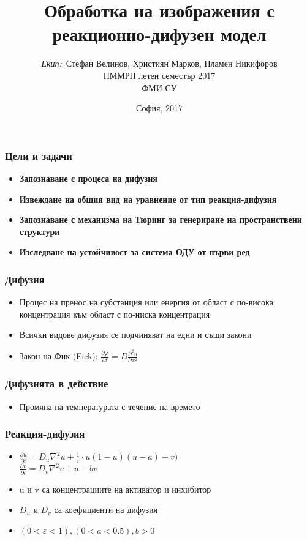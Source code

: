 \documentclass[14pt]{beamer}
\title{\small{Обработка на изображения с реакционно-дифузен модел}}
\author{\small{%
\emph{Екип:}~Стефан Велинов, Християн Марков, Пламен Никифоров}\\
\vspace{30pt}%
ПММРП летен семестър 2017\\
ФМИ-СУ%
\vspace{20pt}%
}
\date{\small{София, 2017}}
\begin{document}
\maketitle

\begin{frame}
\frametitle{Цели и задачи}
\begin{itemize}
  \item \textbf{Запознаване с процеса на дифузия}
  \item \textbf{Извеждане на общия вид на уравнение от тип реакция-дифузия}
  \item \textbf{Запознаване с механизма на Тюринг за генериране на пространствени структури}
  \item \textbf{Изследване на устойчивост за система ОДУ от първи ред}
\end{itemize}
\end{frame}

\begin{frame}
\frametitle{Дифузия}
\begin{itemize}
  \item Процес на пренос на субстанция или енергия от област с по-висока концентрация към област с по-ниска концентрация
  \item Всички видове дифузия се подчиняват на едни и същи закони
  \item Закон на Фик (Fick):
  $ \frac{\partial \varphi}{\partial t} = D \frac{{\partial}^2 u}{\partial x^2} $
\end{itemize}
\end{frame}

\begin{frame}
\frametitle{Дифузията в действие}
\begin{itemize}
  \item Промяна на температурата с течение на времето
\end{itemize}
\begin{center}
\end{center}
\end{frame}

\begin{frame}
\frametitle{Реакция-дифузия}
\begin{itemize}
  \item $\frac{\partial u}{\partial t} = D_{u} \nabla^2 u + \frac{1}{\varepsilon}\cdot u(1-u)(u-a)-v)$\\
  $\frac{\partial v}{\partial t} = D_{v} \nabla^2 v + u -bv$
  \item u и v са концентрациите на активатор и инхибитор
  \item $D_u$ и $D_v$ са коефициенти на дифузия
  \item $(0 < \varepsilon < 1), (0 < a < 0.5), b>0$
\end{itemize}
\end{frame}
\end{document}
